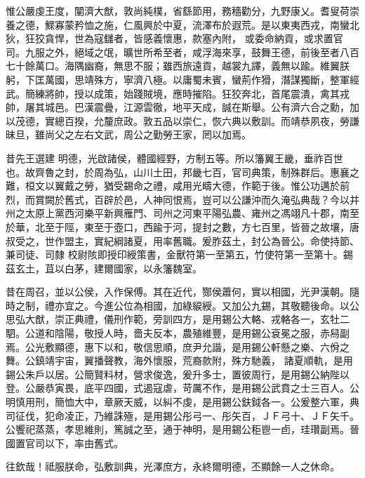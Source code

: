 \begin{pinyinscope}
 惟公嚴虔王度，闡濟大猷，敦尚純樸，省繇節用，務穡勸分，九野康乂。耆叟荷崇養之德，鰥寡蒙矜恤之施，仁風興於中夏，流澤布於遐荒。是以東夷西戎，南蠻北狄，狂狡貪悍，世為寇讎者，皆感義懷惠，款塞內附，
 或委命納貢，或求置官司。九服之外，絕域之氓，曠世所希至者，咸浮海來享，鼓舞王德，前後至者八百七十餘萬口。海隅幽裔，無思不服；雖西旅遠貢，越裳九譯，義無以踰。維翼朕躬，下匡萬國，思靖殊方，寧濟八極。以庸蜀未賓，蠻荊作猾，潛謀獨斷，整軍經武。簡練將帥，授以成策，始踐賊境，應時摧陷。狂狡奔北，首尾震潰，禽其戎帥，屠其城邑。巴漢震疊，江源雲徹，地平天成，誠在斯舉。公有濟六合之勳，加以茂德，實總百揆，允釐庶政。敦五品以崇仁，恢六典以敷訓。而靖恭夙夜，勞謙昧旦，雖尚父之左右文武，周公之勤勞王家，罔以加焉。



 昔先王選建
 明德，光啟諸侯，體國經野，方制五等。所以籓翼王畿，垂祚百世也。故齊魯之封，於周為弘，山川土田，邦畿七百，官司典策，制殊群后。惠襄之難，桓文以翼戴之勞，猶受錫命之禮，咸用光疇大德，作範于後。惟公功邁於前烈，而賞闕於舊式，百辟於邑，人神同恨焉，豈可以公謙沖而久淹弘典哉？今以并州之太原上黨西河樂平新興雁門、司州之河東平陽弘農、雍州之馮翊凡十郡，南至於華，北至于陘，東至于壺口，西踰于河，提封之數，方七百里，皆晉之故壤，唐叔受之，世作盟主，實紀綱諸夏，用率舊職。爰胙茲土，封公為晉公。命使持節、兼司徒、司隸
 校尉陔即授印綬策書，金獸符第一至第五，竹使符第一至第十。錫茲玄土，苴以白茅，建爾國家，以永籓魏室。



 昔在周召，並以公侯，入作保傅。其在近代，酂侯蕭何，實以相國，光尹漢朝。隨時之制，禮亦宜之。今進公位為相國，加綠綟綬。又加公九錫，其敬聽後命。以公思弘大猷，崇正典禮，儀刑作範，旁訓四方，是用錫公大輅、戎輅各一，玄牡二駟。公道和陰陽，敬授人時，嗇夫反本，農殖維豐，是用錫公袞冕之服，赤舄副焉。公光敷顯德，惠下以和，敬信思順，庶尹允諧，是用錫公軒懸之樂、六佾之舞。公鎮靖宇宙，翼播聲教，海外懷服，荒裔款附，殊方馳義，
 諸夏順軌，是用錫公朱戶以居。公簡賢料材，營求俊逸，爰升多士，置彼周行，是用錫公納陛以登。公嚴恭寅畏，底平四國，式遏寇虐，苛厲不作，是用錫公武賁之士三百人。公明慎用刑，簡恤大中，章厥天威，以糾不虔，是用錫公鈇鉞各一。公爰整六軍，典司征伐，犯命凌正，乃維誅殛，是用錫公彤弓一、彤矢百，ＪＦ弓十、ＪＦ矢千。公饗祀蒸蒸，孝思維則，篤誠之至，通于神明，是用錫公秬鬯一卣，珪瓚副焉。晉國置官司以下，率由舊式。



 往欽哉！祗服朕命，弘敷訓典，光澤庶方，永終爾明德，丕顯餘一人之休命。




\end{pinyinscope}

